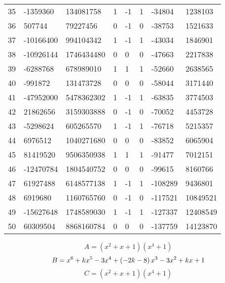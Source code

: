 \documentclass{amsart}
\begin{document}
\begin{longtable}{|l|l|l|lllll|}
35&-1359360&134081758&1&-1&1&-34804&1238103\\
36&507744&79227456&0&-1&0&-38753&1521633\\
37&-10166400&994104342&1&-1&1&-43034&1846901\\
38&-10926144&1746434480&0&0&0&-47663&2217838\\
39&-6288768&678989010&1&1&1&-52660&2638565\\
40&-991872&131473728&0&0&0&-58044&3171440\\
41&-47952000&5478362302&1&-1&1&-63835&3774503\\
42&21862656&3159303888&0&-1&0&-70052&4453728\\
43&-5298624&605265570&1&-1&1&-76718&5215357\\
44&6976512&1040271680&0&0&0&-83852&6065904\\
45&81419520&9506350938&1&1&1&-91477&7012151\\
46&-12470784&1804540752&0&0&0&-99615&8160766\\
47&61927488&6148577138&1&-1&1&-108289&9436801\\
48&6919680&1160765760&0&-1&0&-117521&10849521\\
49&-15627648&1748589030&1&-1&1&-127337&12408549\\
50&60309504&8868160784&0&0&0&-137759&14123870\\
\hline
\end{longtable}
$$A=(x^2
 + x
 + 1)(x^4
 + 1)$$
$$B=x^6
 + k\*x^5
 - 3\*x^4
 + \left(-2\*k
 - 8\right) \*x^3
 - 3\*x^2
 + k\*x
 + 1$$
$$C=(x^2
 + x
 + 1)(x^4
 + 1)$$
\end{document}
